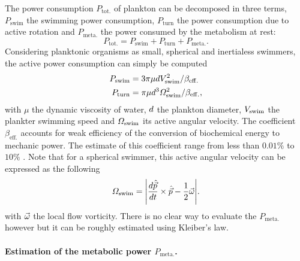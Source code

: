 The power consumption $P_{\mathrm{tot.}}$ of plankton can be decomposed in three terms, $P_{\mathrm{swim}}$ the swimming power consumption, $P_{\mathrm{turn}}$ the power consumption due to active rotation and $P_{\mathrm{meta.}}$ the power consumed by the metabolism at rest:
\begin{equation}
	P_{\mathrm{tot.}} = P_{\mathrm{swim}} + P_{\mathrm{turn}} + P_{\mathrm{meta.}}.
\end{equation}
Considering planktonic organisms as small, spherical and inertialess swimmers, the active power consumption can simply be computed
\begin{subequations}
	\begin{align}
		P_{\mathrm{swim}} &= 3 \pi \mu d V_{\mathrm{swim}}^2 / \beta_{\mathrm{eff.}}\label{eq:p_swim}\\
		P_{\mathrm{turn}} &= \pi \mu d^3 \varOmega_{\mathrm{swim}}^2 / \beta_{\mathrm{eff.}},\label{eq:p_turn}
	\end{align}
\end{subequations}
with $\mu$ the dynamic viscosity of water, $d$ the plankton diameter, $V_{\mathrm{swim}}$ the plankter swimming speed and $\varOmega_{\mathrm{swim}}$ its active angular velocity.
The coefficient $\beta_{\mathrm{eff.}}$ accounts for weak efficiency of the conversion of biochemical energy to mechanic power.
The estimate of this coefficient range from less than $0.01\%$ to $10\%$ \citep{minkina1981estimation, morris1985propulsion, buskey1998energetic}.
Note that for a spherical swimmer, this active angular velocity can be expressed as the following
\begin{equation}
	\SwimmingAngularVelocity = \norm*{\frac{d \SwimmingDirection}{dt} \times \SwimmingDirection - \frac{1}{2} \FlowVorticity}.
\end{equation}
with $\vec{\omega}$ the local flow vorticity.
There is no clear way to evaluate the $P_{\mathrm{meta.}}$ however but it can be roughly estimated using Kleiber's law.

\paragraph{Estimation of the metabolic power $P_{\mathrm{meta.}}$.}

